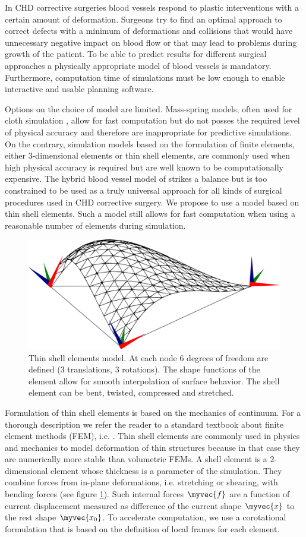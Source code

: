 In CHD corrective surgeries blood vessels respond to plastic interventions with a certain amount of deformation. Surgeons try to find an optimal approach to correct defects with a minimum of deformations and collisions that would have unnecessary negative impact on blood flow or that may lead to problems during growth of the patient. To be able to predict results for different surgical approaches a physically appropriate model of blood vessels is mandatory. Furthermore, computation time of simulations must be low enough to enable interactive and usable planning software.

Options on the choice of model are limited. Mass-spring models, often used for cloth simulation \cite{Volino2005b}, allow for fast computation but do not posses the required level of physical accuracy and therefore are inappropriate for predictive simulations. On the contrary, simulation models based on the formulation of finite elements, either 3-dimensional elements or thin shell elements, are commonly used when high physical accuracy is required but are well known to be computationally expensive. The hybrid blood vessel model of \cite{Li2009} strikes a balance but is too constrained to be used as a truly universal approach for all kinds of surgical procedures used in CHD corrective surgery. We propose to use a model based on thin shell elements. Such a model still allows for fast computation when using a reasonable number of elements during simulation.

\begin{figure}[tbh]
  \centering
  \includegraphics[width=0.4\columnwidth]{img/shell.pdf}
  \caption{Thin shell elements model. At each node 6 degrees of freedom are defined (3 translations, 3 rotations). The shape functions of the element allow for smooth interpolation of surface behavior. The shell element can be bent, twisted, compressed and stretched.}
  \label{fig-shell}
\end{figure}

Formulation of thin shell elements is based on the mechanics of continuum. For a thorough description we refer the reader to a standard textbook about finite element methods (FEM), i.e. \cite{Reddy1993}. Thin shell elements are commonly used in physics and mechanics to model deformation of thin structures because in that case they are numerically more stable than volumetric FEMs. A shell element is a 2-dimensional element whose thickness is a parameter of the simulation. They combine forces from in-plane deformations, i.e. stretching or shearing, with bending forces (see figure \ref{fig-shell}). Such internal forces $\myvec{f}$ are a function of current displacement measured as difference of the current shape $\myvec{x}$ to the rest shape $\myvec{x_0}$. To accelerate computation, we use a corotational formulation that is based on the definition of local frames for each element.

